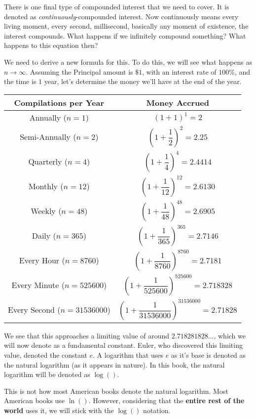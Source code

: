 \documentclass[lang=en,11pt]{elegantbook}
\begin{document}
There is one final type of compounded interest that we need to cover.  It is denoted as \textit{continuously}-compounded interest.  Now continuously means every living moment, every second, millisecond, basically any moment of existence, the interest compounds.  What happens if we infinitely compound something?  What happens to this equation then?

We need to derive a new formula for this.  To do this, we will see what happens as $n\to\infty$.  Assuming the Principal amount is $\$1$, with an interest rate of $100\%$, and the time is $1$ year, let's determine the money we'll have at the end of the year.

\begin{tabular}{||c|c||}
    \hline
    Compilations per Year & Money Accrued \\
    \hline
    Annually ($n=1$) & $(1+1)^1=2$ \\
    \hline
    Semi-Annually ($n=2$) & $\left(1+\dfrac{1}{2}\right)^{2}=2.25$ \\
    \hline
    Quarterly ($n=4$) & $\left(1+\dfrac{1}{4}\right)^{4}=2.4414$ \\
    \hline
    Monthly ($n=12$) & $\left(1+\dfrac{1}{12}\right)^{12}=2.6130$ \\
    \hline
    Weekly ($n=48$) & $\left(1+\dfrac{1}{48}\right)^{48}=2.6905$ \\
    \hline
    Daily ($n=365$) & $\left(1+\dfrac{1}{365}\right)^{365}=2.7146$ \\
    \hline
    Every Hour ($n=8760$) & $\left(1+\dfrac{1}{8760}\right)^{8760}=2.7181$ \\
    \hline
    Every Minute ($n=525600$) & $\left(1+\dfrac{1}{525600}\right)^{525600}=2.718328$ \\
    \hline
    Every Second ($n=31536000$) & $\left(1+\dfrac{1}{31536000}\right)^{31536000}=2.71828$ \\
    \hline
\end{tabular}

We see that this approaches a limiting value of around $2.718281828\ldots$, which we will now denote as a fundamental constant.  Euler, who discovered this limiting value, denoted the constant $e$.  A logarithm that uses $e$ as it's base is denoted as the natural logarithm (as it appears in nature).  In this book, the natural logarithm will be denoted as $\log()$.

\begin{remark}
This is not how most American books denote the natural logarithm.  Most American books use $\ln()$.  However, considering that the \textbf{entire rest of the world} uses it, we will stick with the $\log()$ notation.
\end{remark}
\end{document}
